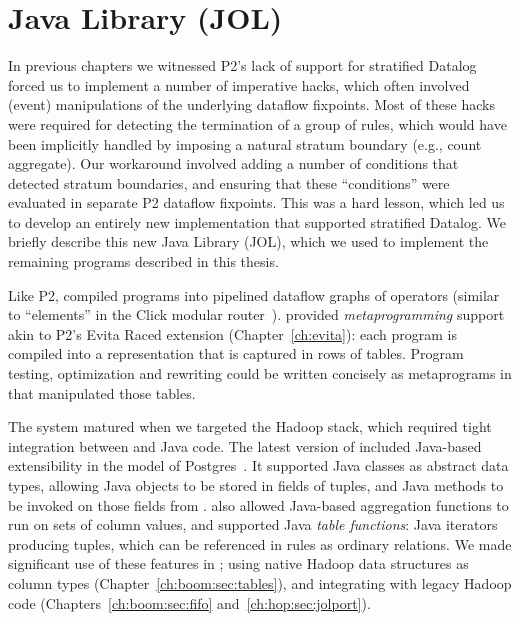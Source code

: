 \section{Java \OVERLOG Library (JOL)}
\label{ch:boom:sec:jol}

In previous chapters we witnessed P2's lack of support for stratified Datalog
forced us to implement a number of imperative hacks, which often involved
(event) manipulations of the underlying dataflow fixpoints.  Most of these
hacks were required for detecting the termination of a group of rules, which
would have been implicitly handled by imposing a natural stratum boundary
(e.g., count aggregate).  Our workaround involved adding a number of conditions
that detected stratum boundaries, and ensuring that these ``conditions'' were
evaluated in separate P2 dataflow fixpoints.  This was a hard lesson, which led
us to develop an entirely new \OVERLOG implementation that supported stratified
Datalog.  We briefly describe this new Java \OVERLOG Library (JOL), which we
used to implement the remaining \OVERLOG programs described in this thesis.

Like P2, \JOL compiled \OVERLOG programs into pipelined dataflow graphs of
operators (similar to ``elements'' in the Click modular router~\cite{click}).
\JOL provided {\em metaprogramming} support akin to P2's Evita Raced extension
(Chapter~\ref{ch:evita}): each \OVERLOG program is compiled into a
representation that is captured in rows of tables.  Program testing,
optimization and rewriting could be written concisely as metaprograms in
\OVERLOG that manipulated those tables.

The \JOL system matured when we targeted the Hadoop stack, which required tight
integration between \OVERLOG and Java code.  The latest version of \JOL
included Java-based extensibility in the model of Postgres~\cite{postgres}.  It
supported Java classes as abstract data types, allowing Java objects to be
stored in fields of tuples, and Java methods to be invoked on those fields from
\OVERLOG.  \JOL also allowed Java-based aggregation functions to run on sets of
column values, and supported Java {\em table functions}: Java iterators
producing tuples, which can be referenced in \OVERLOG rules as ordinary
relations.  We made significant use of these features in \BOOMA; using native
Hadoop data structures as column types (Chapter~\ref{ch:boom:sec:tables}), and
integrating with legacy Hadoop code (Chapters~\ref{ch:boom:sec:fifo}
and~\ref{ch:hop:sec:jolport}).


